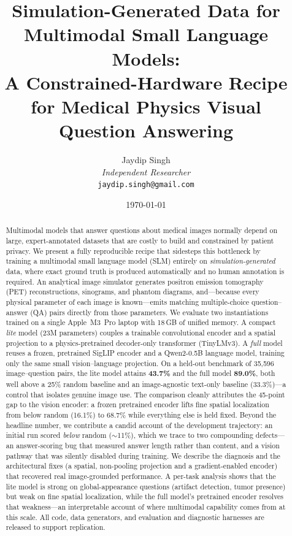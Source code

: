 \documentclass[11pt]{article}
\title{Simulation-Generated Data for Multimodal Small Language Models:\\
A Constrained-Hardware Recipe for Medical Physics Visual Question Answering}
\author{
  Jaydip Singh\\
  \textit{Independent Researcher}\\
  \texttt{jaydip.singh@gmail.com}
}
\date{\today}
\begin{document}
\maketitle

\begin{abstract}
Multimodal models that answer questions about medical images normally depend on
large, expert-annotated datasets that are costly to build and constrained by
patient privacy. We present a fully reproducible recipe that sidesteps this
bottleneck by training a multimodal small language model (SLM) entirely on
\emph{simulation-generated} data, where exact ground truth is produced
automatically and no human annotation is required. An analytical image simulator
generates positron emission tomography (PET) reconstructions, sinograms, and
phantom diagrams, and---because every physical parameter of each image is
known---emits matching multiple-choice question--answer (QA) pairs directly from
those parameters. We evaluate two instantiations trained on a single Apple~M3~Pro laptop with
18\,GB of unified memory. A compact \emph{lite} model (23M parameters) couples a
trainable convolutional encoder and a spatial projection to a physics-pretrained
decoder-only transformer (TinyLMv3). A \emph{full} model reuses a frozen,
pretrained SigLIP encoder and a Qwen2-0.5B language model, training only the same
small vision--language projection. On a held-out benchmark of 35{,}596
image--question pairs, the lite model attains \textbf{43.7\%} and the full model
\textbf{89.0\%}, both well above a 25\% random baseline and an image-agnostic
text-only baseline (33.3\%)---a control that isolates genuine image use. The
comparison cleanly attributes the 45-point gap to the vision encoder: a frozen
pretrained encoder lifts fine spatial localization from below random (16.1\%) to
68.7\% while everything else is held fixed. Beyond the headline number, we contribute a candid account of the
development trajectory: an initial run scored \emph{below} random ($\sim$11\%),
which we trace to two compounding defects---an answer-scoring bug that measured
answer length rather than content, and a vision pathway that was silently
disabled during training. We describe the diagnosis and the architectural fixes
(a spatial, non-pooling projection and a gradient-enabled encoder) that recovered
real image-grounded performance. A per-task analysis shows that the lite model is
strong on global-appearance questions (artifact detection, tumor presence) but
weak on fine spatial localization, while the full model's pretrained encoder
resolves that weakness---an interpretable account of where multimodal capability
comes from at this scale. All code, data generators, and evaluation and
diagnostic harnesses are released to support replication.
\end{abstract}
\end{document}
